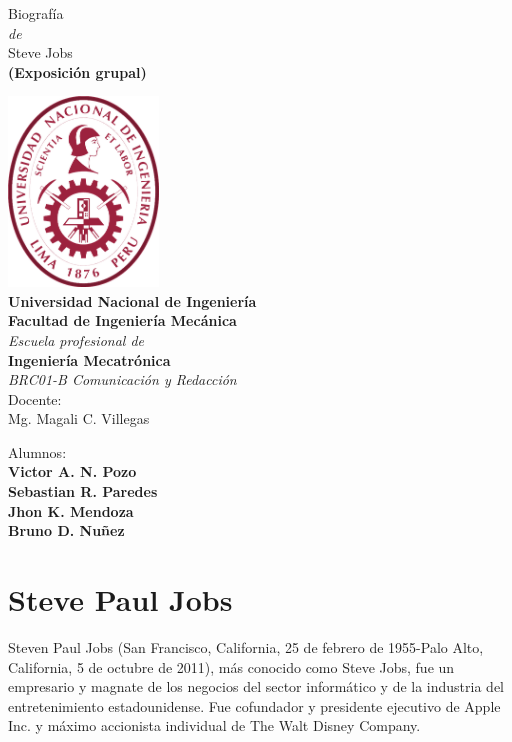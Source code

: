 \documentclass[notumble,10pt,a4paper]{leaflet}
\begin{document}
\begin{center}
	{\Large Biografía} \\[.3cm]
	\textit{de}\\[.4cm]
	{\huge {Steve Jobs}}\\ [.3cm]
	\textbf{{\large (Exposición grupal)}}\\[.5cm]
	\vfill
	
	\includegraphics[width=4cm]{img/logouni.png}\\
	\label{fig:logo}
	\textbf{Universidad Nacional de Ingeniería}\\
	{\large \textbf{Facultad de Ingeniería Mecánica}}\\[.5cm]
	\textit{\large{Escuela profesional de}}\\[.3cm]
	{\large \textbf{Ingeniería Mecatrónica}}\\[.5cm]
	\textit{BRC01-B Comunicación y Redacción}\\
	\large{Docente:\\
		Mg. Magali C. Villegas}
	
	\vfill
	Alumnos:\\ 
	\textbf{Victor A. N. Pozo\\
		Sebastian R. Paredes\\
		Jhon K. Mendoza\\
		Bruno D. Nuñez}\\
\end{center}
\thispagestyle{empty} 

\newpage
\section{\large{Steve Paul Jobs}}
Steven Paul Jobs (San Francisco, California, 25 de febrero de 1955-Palo Alto, California, 5 de octubre de 2011), más conocido como Steve Jobs, fue un empresario y magnate de los negocios del sector informático y de la industria del entretenimiento estadounidense. Fue cofundador y presidente ejecutivo de Apple Inc. y máximo accionista individual de The Walt Disney Company\cite{isaacson2011steve}.
\end{document}
